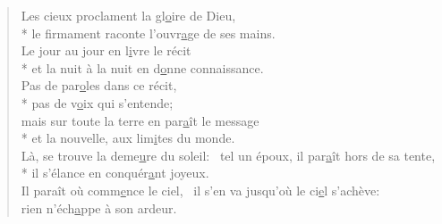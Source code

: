 
\begin{verse}
Les cieux proclament la gl\underline{o}ire de Dieu, \\*
le firmament raconte l’ouvr\underline{a}ge de ses mains. \\
Le jour au jour en l\underline{i}vre le récit \\*
et la nuit à la nuit en d\underline{o}nne connaissance. \\

Pas de par\underline{o}les dans ce récit, \\*
pas de v\underline{o}ix qui s’entende; \\
mais sur toute la terre en par\underline{a}ît le message \\*
et la nouvelle, aux lim\underline{i}tes du monde. \\

Là, se trouve la deme\underline{u}re du soleil:~\psalmdagger
{}tel un époux, il par\underline{a}ît hors de sa tente, \\*
il s’élance en conquér\underline{a}nt joyeux. \\

Il paraît où comm\underline{e}nce le ciel,~\psalmdagger
il s’en va jusqu’où le ci\underline{e}l s’achève: \\
rien n’éch\underline{a}ppe à son ardeur. \\
\end{verse}

